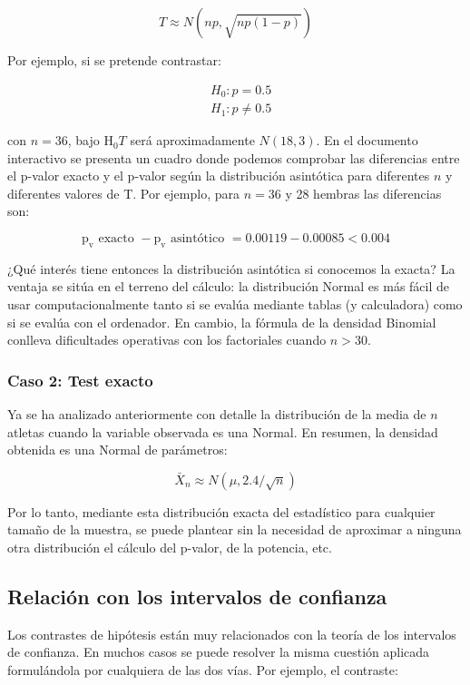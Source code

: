 \documentclass[
]{article}
\begin{document}
\[
T \approx N(n p, \sqrt{n p(1-p)})
\]

Por ejemplo, si se pretende contrastar:

\[
\begin{aligned}
& H_{0}: p=0.5 \\
& H_{1}: p \neq 0.5
\end{aligned}
\]

con \(n=36\), bajo \(\mathrm{H}_{0} T\) será aproximadamente \(N(18,3)\). En el documento interactivo se presenta un cuadro donde podemos comprobar las diferencias entre el p-valor exacto y el p-valor según la distribución asintótica para diferentes \(n\) y diferentes valores de T. Por ejemplo, para \(n=36\) y 28 hembras las diferencias son:

\[
\mathrm{p}_{\mathrm{v}}\text{ exacto }-\mathrm{p}_{\mathrm{v}}\text{ asintótico }=0.00119-0.00085<0.004
\]

¿Qué interés tiene entonces la distribución asintótica si conocemos la exacta? La ventaja se sitúa en el terreno del cálculo: la distribución Normal es más fácil de usar computacionalmente tanto si se evalúa mediante tablas (y calculadora) como si se evalúa con el ordenador. En cambio, la fórmula de la densidad Binomial conlleva dificultades operativas con los factoriales cuando \(n>30\).

\subsubsection{Caso 2: Test exacto}\label{caso-2-test-exacto}

Ya se ha analizado anteriormente con detalle la distribución de la media de \(n\) atletas cuando la variable observada es una Normal. En resumen, la densidad obtenida es una Normal de parámetros:

\[
\bar{X}_{n} \approx N(\mu, 2.4 / \sqrt{n})
\]

Por lo tanto, mediante esta distribución exacta del estadístico para cualquier tamaño de la muestra, se puede plantear sin la necesidad de aproximar a ninguna otra distribución el cálculo del p-valor, de la potencia, etc.

\subsection{Relación con los intervalos de confianza}\label{relaciuxf3n-con-los-intervalos-de-confianza}

Los contrastes de hipótesis están muy relacionados con la teoría de los intervalos de confianza. En muchos casos se puede resolver la misma cuestión aplicada formulándola por cualquiera de las dos vías. Por ejemplo, el contraste:
\end{document}
